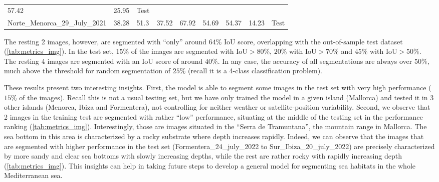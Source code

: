 \begin{table}[H]
{\begin{tabular}{lllllllll}
            57.42
                                                   & 25.95               &
            {\color[HTML]{fc8d62} Test}
            \\
            Norte\_Menorca\_29\_July\_2021         & 38.28               & 51.3
                                                   & 37.52               &
            67.92
                                                   & 54.69               &
            54.37
                                                   & 14.23               &
            {\color[HTML]{fc8d62} Test}
            \\ \bottomrule
        \end{tabular}%
    }
\end{table}

The resting 2 images, however, are segmented with ``only''
around $64\%$ IoU score, overlapping with the out-of-sample test dataset
(\cref{tab:metrics_img}). In the test set, $15\%$ of the images are segmented
with IoU$>80\%$, $20\%$ with IoU$>70\%$ and $45\%$ with IoU$>50\%$. The resting
4 images are segmented with an IoU score of around $40\%$. In any case, the
accuracy of all segmentations are always over $50\%$, much above the threshold
for random segmentation of $25\%$ (recall it is a 4-class classification
problem).

These results present two interesting insights. First, the model is able to
segment some images in the test set with very high performance ($15\%$ of the
images). Recall this is not a usual testing set, but we have only trained the
model in a given island (Mallorca) and tested it in 3 other islands (Menorca,
Ibiza and Formentera), not controlling for neither weather or
satellite-position variability. Second, we observe that 2 images in the
training test are segmented with rather ``low'' performance, situating at the
middle of the testing set in the performance ranking
(\cref{tab:metrics_img}). Interestingly, those are images situated in the
``Serra de Tramuntana'', the mountain range in Mallorca. The sea bottom in this
area is characterized by a rocky substrate where depth increases rapidly.
Indeed, we can observe that the images that are segmented with higher
performance in the test set (Formentera\_24\_july\_2022 to
Sur\_Ibiza\_20\_july\_2022) are precisely characterized by more sandy and clear
sea bottoms with slowly increasing depths, while the rest are rather rocky with
rapidly increasing depth (\cref{tab:metrics_img}). This insights can help in
taking future steps to develop a general model for segmenting sea habitats in
the whole Mediterranean sea.

